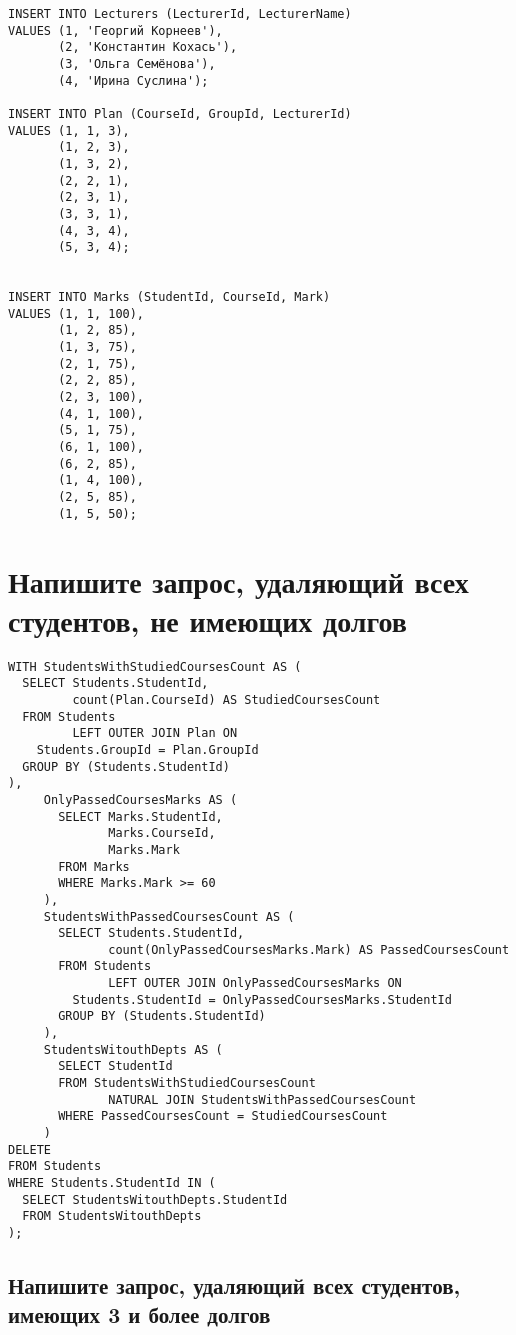 \documentclass{article}
\begin{document}
\begin{verbatim}
INSERT INTO Lecturers (LecturerId, LecturerName)
VALUES (1, 'Георгий Корнеев'),
       (2, 'Константин Кохась'),
       (3, 'Ольга Семёнова'),
       (4, 'Ирина Суслина');

INSERT INTO Plan (CourseId, GroupId, LecturerId)
VALUES (1, 1, 3),
       (1, 2, 3),
       (1, 3, 2),
       (2, 2, 1),
       (2, 3, 1),
       (3, 3, 1),
       (4, 3, 4),
       (5, 3, 4);


INSERT INTO Marks (StudentId, CourseId, Mark)
VALUES (1, 1, 100),
       (1, 2, 85),
       (1, 3, 75),
       (2, 1, 75),
       (2, 2, 85),
       (2, 3, 100),
       (4, 1, 100),
       (5, 1, 75),
       (6, 1, 100),
       (6, 2, 85),
       (1, 4, 100),
       (2, 5, 85),
       (1, 5, 50);
\end{verbatim}

\section{Напишите запрос, удаляющий всех студентов, не имеющих долгов}

\begin{verbatim}
WITH StudentsWithStudiedCoursesCount AS (
  SELECT Students.StudentId,
         count(Plan.CourseId) AS StudiedCoursesCount
  FROM Students
         LEFT OUTER JOIN Plan ON
    Students.GroupId = Plan.GroupId
  GROUP BY (Students.StudentId)
),
     OnlyPassedCoursesMarks AS (
       SELECT Marks.StudentId,
              Marks.CourseId,
              Marks.Mark
       FROM Marks
       WHERE Marks.Mark >= 60
     ),
     StudentsWithPassedCoursesCount AS (
       SELECT Students.StudentId,
              count(OnlyPassedCoursesMarks.Mark) AS PassedCoursesCount
       FROM Students
              LEFT OUTER JOIN OnlyPassedCoursesMarks ON
         Students.StudentId = OnlyPassedCoursesMarks.StudentId
       GROUP BY (Students.StudentId)
     ),
     StudentsWitouthDepts AS (
       SELECT StudentId
       FROM StudentsWithStudiedCoursesCount
              NATURAL JOIN StudentsWithPassedCoursesCount
       WHERE PassedCoursesCount = StudiedCoursesCount
     )
DELETE
FROM Students
WHERE Students.StudentId IN (
  SELECT StudentsWitouthDepts.StudentId
  FROM StudentsWitouthDepts
);
\end{verbatim}

\subsection{Напишите запрос, удаляющий всех студентов, имеющих 3 и более долгов}
\end{document}
